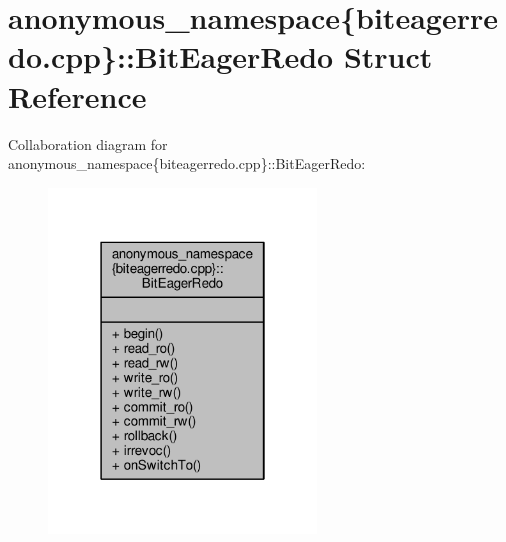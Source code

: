 \hypertarget{structanonymous__namespace_02biteagerredo_8cpp_03_1_1BitEagerRedo}{\section{anonymous\-\_\-namespace\{biteagerredo.\-cpp\}\-:\-:Bit\-Eager\-Redo Struct Reference}
\label{structanonymous__namespace_02biteagerredo_8cpp_03_1_1BitEagerRedo}
}


Collaboration diagram for anonymous\-\_\-namespace\{biteagerredo.\-cpp\}\-:\-:Bit\-Eager\-Redo\-:
\nopagebreak
\begin{figure}[H]
\begin{center}
\leavevmode
\includegraphics[width=202pt]{structanonymous__namespace_02biteagerredo_8cpp_03_1_1BitEagerRedo__coll__graph}
\end{center}
\end{figure}
